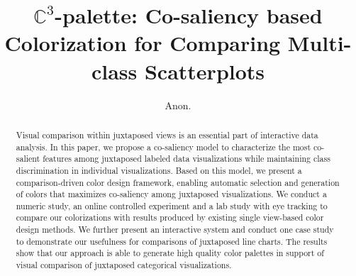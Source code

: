 \documentclass[manuscript,screen,review]{acmart}
\newcommand{\toolname}{$\mathbb{C}^3$}
\begin{document}
\graphicspath{{figures/}{pictures/}{images/}{./}} %
\title{\toolname-palette: Co-saliency based Colorization for Comparing Multi-class Scatterplots}
%
%
\author{Anon.}

\begin{abstract}
Visual comparison within juxtaposed views is an essential part of interactive data analysis. In this paper, we propose a co-saliency model to characterize the most co-salient features among juxtaposed labeled data visualizations while maintaining class discrimination in individual visualizations.
Based on this model, we present a comparison-driven color design framework, enabling automatic selection and generation of colors that maximizes co-saliency among juxtaposed visualizations. We conduct a numeric study, an online controlled experiment and a lab study with eye tracking to compare our colorizations with results produced by existing single view-based color design methods. We further present an interactive system and conduct one case study to demonstrate our usefulness for comparisons of juxtaposed line charts. The results show that our approach is able to generate high quality color palettes in support of visual comparison of juxtaposed categorical visualizations.

\end{abstract}
\end{document}
